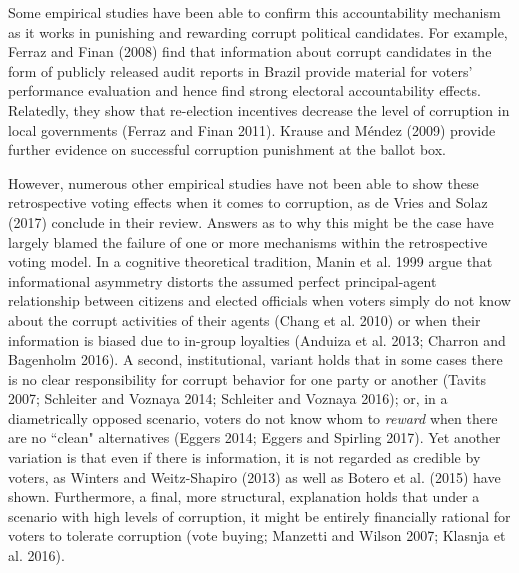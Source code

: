 \documentclass[11pt]{article}
\begin{document}
Some empirical studies have been able to confirm this accountability mechanism as it works in punishing and rewarding corrupt political candidates. For example, Ferraz and Finan (2008) find that information about corrupt candidates in the form of publicly released audit reports in Brazil provide material for voters' performance evaluation and hence find strong electoral accountability effects. Relatedly, they show that re-election incentives decrease the level of corruption in local governments (Ferraz and Finan 2011). Krause and Méndez (2009) provide further evidence on successful corruption punishment at the ballot box.

However, numerous other empirical studies have not been able to show these retrospective voting effects when it comes to corruption, as de Vries and Solaz (2017) conclude in their review. Answers as to why this might be the case have largely blamed the failure of one or more mechanisms within the retrospective voting model. In a cognitive theoretical tradition, Manin et al. 1999 argue that informational asymmetry distorts the assumed perfect principal-agent relationship between citizens and elected officials when voters simply do not know about the corrupt activities of their agents (Chang et al. 2010) or when their information is biased due to in-group loyalties (Anduiza et al. 2013; Charron and Bagenholm 2016). A second, institutional, variant holds that in some cases there is no clear responsibility for corrupt behavior for one party or another (Tavits 2007; Schleiter and Voznaya 2014; Schleiter and Voznaya 2016); or, in a diametrically opposed scenario, voters do not know whom to \textit{reward} when there are no “clean" alternatives (Eggers 2014; Eggers and Spirling 2017). Yet another variation is that even if there is information, it is not regarded as credible by voters, as Winters and Weitz-Shapiro (2013) as well as Botero et al. (2015) have shown. Furthermore, a final, more structural, explanation holds that under a scenario with high levels of corruption, it might be entirely financially rational for voters to tolerate corruption (vote buying; Manzetti and Wilson 2007; Klasnja et al. 2016).
\end{document}
